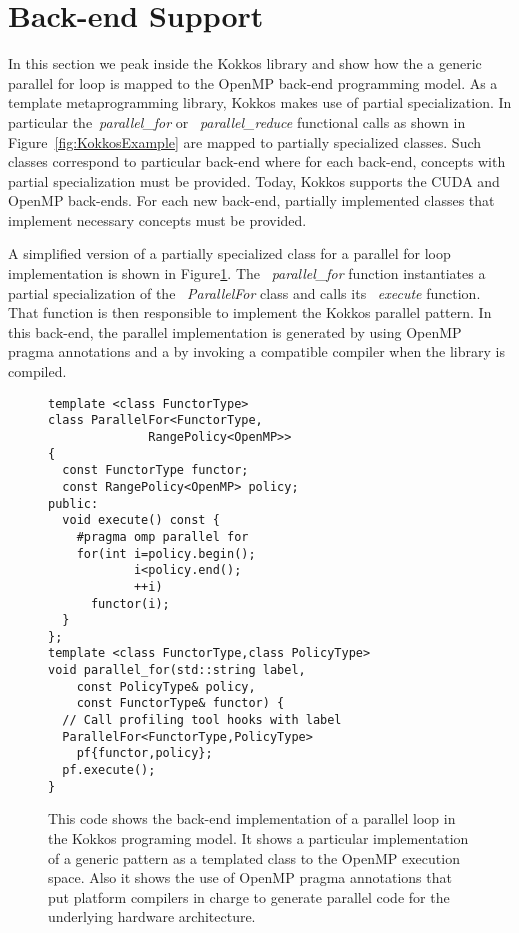 
\section{Back-end Support}\label{chap:backend}

In this section we peak inside the Kokkos library and show how the a generic parallel for loop is mapped to the OpenMP back-end programming model. As a template metaprogramming library, Kokkos makes use of partial specialization. In particular the~\emph{parallel\_for} or ~\emph{parallel\_reduce} functional calls as shown in Figure~\ref{fig:KokkosExample} are mapped to partially specialized classes. Such classes correspond to particular back-end where for each back-end, concepts with partial specialization must be provided. Today, Kokkos supports the CUDA and OpenMP back-ends. For each new back-end, partially implemented classes that implement necessary concepts must be provided.

A simplified version of a partially specialized class for a parallel for loop implementation is shown in Figure\ref{fig:KokkosExampleOMPBackEnd}. The ~\emph{parallel\_for} function instantiates a partial specialization of the ~\emph{ParallelFor} class and calls its ~\emph{execute} function. That function is then responsible to implement the Kokkos parallel pattern. In this back-end, the parallel implementation is generated by using OpenMP pragma annotations and a by invoking a compatible compiler when the library is compiled. 
\begin{figure}
\begin{small}
\begin{verbatim}
template <class FunctorType>
class ParallelFor<FunctorType,
              RangePolicy<OpenMP>> 
{
  const FunctorType functor;
  const RangePolicy<OpenMP> policy; 
public:
  void execute() const {
    #pragma omp parallel for
    for(int i=policy.begin();
            i<policy.end();
            ++i)
      functor(i);
  }
};
template <class FunctorType,class PolicyType>
void parallel_for(std::string label, 
    const PolicyType& policy,
    const FunctorType& functor) {
  // Call profiling tool hooks with label
  ParallelFor<FunctorType,PolicyType> 
    pf{functor,policy};
  pf.execute();
}
\end{verbatim}
\end{small}
\caption{This code shows the back-end implementation of a parallel loop in the Kokkos programing model. It shows a particular implementation of a generic pattern as a templated class to the OpenMP execution space. Also it shows the use of OpenMP pragma annotations that put platform compilers in charge to generate parallel code for the underlying hardware architecture.}
\label{fig:KokkosExampleOMPBackEnd}
\end{figure}


